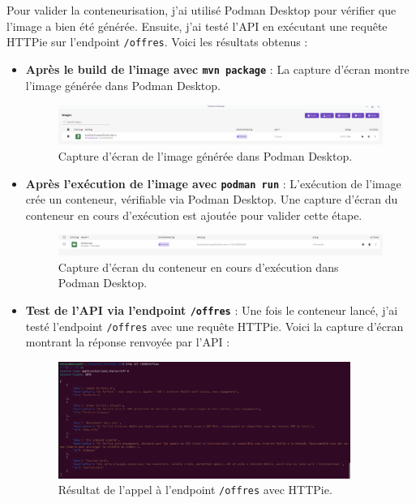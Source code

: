\documentclass{article}
\begin{document}
	Pour valider la conteneurisation, j'ai utilisé Podman Desktop pour vérifier que l'image a bien été générée. Ensuite, j'ai testé l'API en exécutant une requête HTTPie sur l'endpoint \texttt{/offres}. Voici les résultats obtenus :
	\begin{itemize}
		\item \textbf{Après le build de l'image avec \texttt{mvn package}} : La capture d'écran montre l'image générée dans Podman Desktop.
		\begin{figure}[h!]
			\centering
			\includegraphics[width=1\textwidth]{asset/image_podman.png}
			\caption{Capture d'écran de l'image générée dans Podman Desktop.}
			\label{fig:image_podman}
		\end{figure}
		
		\item \textbf{Après l'exécution de l'image avec \texttt{podman run}} : L'exécution de l'image crée un conteneur, vérifiable via Podman Desktop. Une capture d'écran du conteneur en cours d'exécution est ajoutée pour valider cette étape.
		\begin{figure}[h!]
			\centering
			\includegraphics[width=1\textwidth]{asset/conteneur_podman.png}
			\caption{Capture d'écran du conteneur en cours d'exécution dans Podman Desktop.}
			\label{fig:conteneur_podman}
		\end{figure}
		
		\item \textbf{Test de l'API via l'endpoint \texttt{/offres}} : Une fois le conteneur lancé, j'ai testé l'endpoint \texttt{/offres} avec une requête HTTPie. Voici la capture d'écran montrant la réponse renvoyée par l'API :
		\begin{figure}[h!]
			\centering
			\includegraphics[width=0.9\textwidth]{asset/appel_api_conteneur.png}
			\caption{Résultat de l'appel à l'endpoint \texttt{/offres} avec HTTPie.}
			\label{fig:appel_api_conteneur}
		\end{figure}
	\end{itemize}
	\newpage
\end{document}
